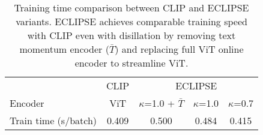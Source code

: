 \begin{table}[t]
  \centering
  \small
  \begin{tabular}{l|c|c c c }
    \toprule
     & CLIP &    \multicolumn{3}{c}{ECLIPSE}   \\
    Encoder & ViT & $\kappa$=1.0 + $\bar{T}$   & $\kappa$=1.0   & $\kappa$=0.7 \\ \midrule
    Train time (s/batch)  &  0.409  & 0.500 & 0.484 & 0.415  \\
    \bottomrule
  \end{tabular}
  \vspace{0.5em}
  \caption{
  Training time comparison between CLIP and ECLIPSE variants. ECLIPSE achieves comparable training speed with CLIP even with disillation by removing text momentum encoder ($\bar{T}$) and replacing full ViT online encoder to streamline ViT. 
  }
  \label{tab:cost}
\end{table}